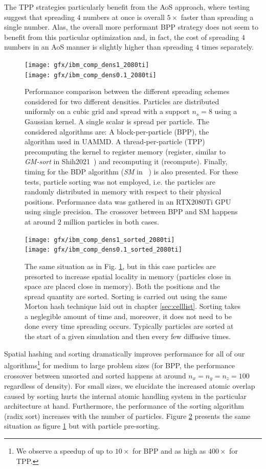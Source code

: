 \documentclass[twoside,openright,titlepage,numbers=noenddot,%
headinclude,footinclude,cleardoublepage=empty,abstract=on,
BCOR=5mm,fontsize=11pt, dvipsnames, paper=b5
]{scrreprt}
\newcommand{\uammd}{\gls{UAMMD}\xspace}
\newcommand{\gpu}{\gls{GPU}\xspace}
\begin{document}
The TPP strategies particularly benefit from the AoS approach, where testing suggest that spreading $4$ numbers at once is overall $5\times$ faster than spreading a single number. Alas, the overall more performant BPP strategy does not seem to benefit from this particular optimization and, in fact, the cost of spreading $4$ numbers in an AoS manner is slightly higher than spreading $4$ times separately.
\begin{figure}
  \centering
  \texttt{[image: gfx/ibm\_comp\_dens1\_2080ti]}\\
  \texttt{[image: gfx/ibm\_comp\_dens0.1\_2080ti]}
\caption[ ]{Performance comparison between the different spreading schemes considered for two different densities. Particles are distributed uniformly on a cubic grid and spread with a support $n_s=8$ using a Gaussian kernel. A single scalar is spread per particle. The considered algorithms are: A block-per-particle (BPP), the algorithm used in \uammd. A thread-per-particle (TPP) precomputing the kernel to register memory (register, similar to \emph{GM-sort} in Shih2021~\cite{Shih2021}) and recomputing it (recompute). Finally, timing for the BDP algorithm (\emph{SM} in ~\cite{Shih2021}) is also presented. For these tests, particle sorting was not employed, i.e. the particles are randomly distributed in memory with respect to their physical positions. Performance data was gathered in an RTX2080Ti \gpu using single precision. The crossover between BPP and SM happens at around $2$ million particles in both cases.}
\label{fig:ibmcomp}
\end{figure}

\begin{figure}
  \centering
  \texttt{[image: gfx/ibm\_comp\_dens1\_sorted\_2080ti]}\\
  \texttt{[image: gfx/ibm\_comp\_dens0.1\_sorted\_2080ti]}
\caption[ ]{The same situation as in Fig. \ref{fig:ibmcomp}, but in this case particles are presorted to increase spatial locality in memory (particles close in space are placed close in memory). Both the positions and the spread quantity are sorted. Sorting is carried out using the same Morton hash technique laid out in chapter \ref{sec:celllist}. Sorting takes a neglegible amount of time and, moreover, it does not need to be done every time spreading occurs. Typically particles are sorted at the start of a given simulation and then every few diffusive times.}
\label{fig:ibmcompsorted}
\end{figure}

Spatial hashing and sorting dramatically improves performance for all of our algorithms\footnote{We observe a speedup of up to $10\times $ for BPP and as high as $400\times $ for TPP.} for medium to large problem sizes (for BPP, the performance crossover between unsorted and sorted happens at around $n_x=n_y=n_z=100$ regardless of density). For small sizes, we elucidate the increased atomic overlap caused by sorting hurts the internal atomic handling system in the particular architecture at hand. Furthermore, the performance of the sorting algorithm (radix sort) increases with the number of particles. Figure \ref{fig:ibmcompsorted} presents the same situation as figure \ref{fig:ibmcomp} but with particle pre-sorting.
\end{document}
